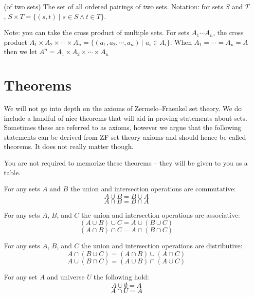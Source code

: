 \documentclass[main.tex]{subfiles}
\begin{document}
\begin{defn}
	(of two sets) The set of all ordered pairings of two sets. Notation: for sets \(S\) and \(T\), \(S \times T = \{(s,t) \mid s \in S \land t \in T\}\).
	
	Note: you can take the cross product of multiple sets. For sets \(A_1 \cdots A_n\), the cross product \(A_1 \times A_2 \times \cdots \times A_n = \{(a_1, a_2, \cdots, a_n) \mid a_i \in A_i\}\). When \(A_1 = \cdots = A_n = A\) then we let \(A^n = A_1 \times A_2 \times \cdots \times A_n\)
\end{defn}

\section{Theorems}

We will not go into depth on the axioms of Zermelo–Fraenkel set theory. We do include a handful of nice theorems that will aid in proving statements about sets. Sometimes these are referred to as axioms, however we argue that the following statements can be derived from ZF set theory axioms and should hence be called theorems. It does not really matter though.

You are not required to memorize these theorems -- they will be given to you as a table.

\begin{thm}[Commutativity]
	For any sets \(A\) and \(B\) the union and intersection operations are commutative: \[A \cup B = B \cup A\] \[A \cap B = B \cap A\]
\end{thm}

\begin{thm}[Associativity]
	For any sets \(A\), \(B\), and \(C\) the union and intersection operations are associative: \[(A \cup B) \cup C = A \cup (B \cup C)\] \[(A \cap B) \cap C = A \cap (B \cap C)\]
\end{thm}

\begin{thm}[Distributivity]
	For any sets \(A\), \(B\), and \(C\) the union and intersection operations are distributive: \[A \cap (B \cup C) = (A \cap B) \cup (A \cap C)\] \[A \cup (B \cap C) = (A \cup B) \cap (A \cup C)\]
\end{thm}

\begin{thm}[Identity]
	For any set \(A\) and universe \(U\) the following hold: \[A \cup \emptyset = A\] \[A \cap U = A\]
\end{thm}
\end{document}
